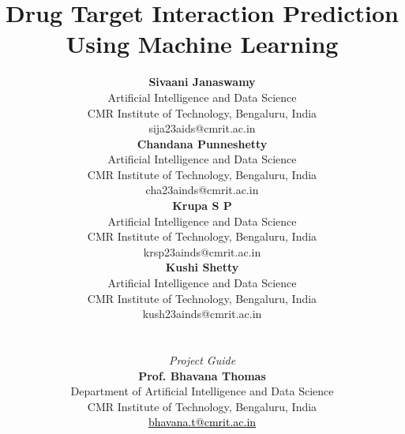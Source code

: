 \documentclass[10pt,conference]{IEEEtran}
\begin{document}
\title{Drug Target Interaction Prediction Using Machine Learning}

\author{
\begin{minipage}{0.45\textwidth}
\centering
\textbf{Sivaani Janaswamy}\\
Artificial Intelligence and Data Science\\
CMR Institute of Technology, Bengaluru, India\\
sija23aids@cmrit.ac.in

\vspace{1em}

\textbf{Chandana Punneshetty}\\
Artificial Intelligence and Data Science\\
CMR Institute of Technology, Bengaluru, India\\
cha23ainds@cmrit.ac.in
\end{minipage}
\hfill
\begin{minipage}{0.45\textwidth}
\centering
\textbf{Krupa S P}\\
Artificial Intelligence and Data Science\\
CMR Institute of Technology, Bengaluru, India\\
krsp23ainds@cmrit.ac.in

\vspace{1em}

\textbf{Kushi Shetty}\\
Artificial Intelligence and Data Science\\
CMR Institute of Technology, Bengaluru, India\\
kush23ainds@cmrit.ac.in
\end{minipage}
\\[1.25em]
\begin{minipage}{0.98\textwidth}
\centering
\textit{Project Guide}\\
\textbf{Prof. Bhavana Thomas}\\
Department of Artificial Intelligence and Data Science\\
CMR Institute of Technology, Bengaluru, India\\
\href{mailto:bhavana.t@cmrit.ac.in}{\textcolor{black}{bhavana.t@cmrit.ac.in}}
\end{minipage}
}

\maketitle
\end{document}
